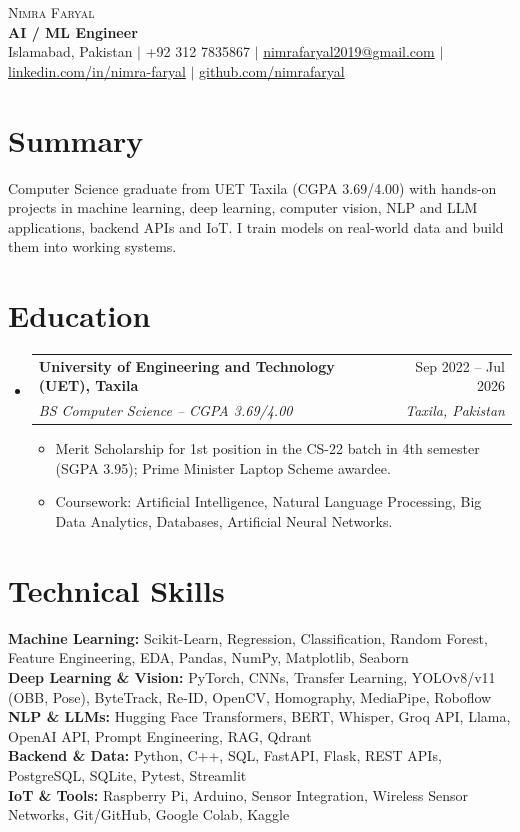 \documentclass[a4paper,10pt]{article}
\makeatletter
\newcommand{\resumeItem}[1]{\item\small{#1 \vspace{-2pt}}}
\newcommand{\resumeSubheading}[4]{
  \vspace{-2pt}\item
    \begin{tabular*}{\textwidth}[t]{l@{\extracolsep{\fill}}r}
      \textbf{#1} & \small #2 \\
      \small\textit{#3} & \small\textit{#4} \\
    \end{tabular*}\vspace{-6pt}
}
\newcommand{\resumeSubHeadingListStart}{\begin{itemize}[leftmargin=0.0in, label={}]}
\newcommand{\resumeSubHeadingListEnd}{\end{itemize}}
\newcommand{\resumeItemListStart}{\begin{itemize}[leftmargin=0.18in, itemsep=0pt]}
\newcommand{\resumeItemListEnd}{\end{itemize}\vspace{-4pt}}
\makeatother
\begin{document}
\begin{center}
    {\Huge \scshape Nimra Faryal} \\ \vspace{2pt}
    \textbf{AI / ML Engineer} \\ \vspace{3pt}
    \small Islamabad, Pakistan $|$ +92 312 7835867 $|$
    \href{mailto:nimrafaryal2019@gmail.com}{nimrafaryal2019@gmail.com} $|$
    \href{https://www.linkedin.com/in/nimra-faryal-47494225b/}{linkedin.com/in/nimra-faryal} $|$
    \href{https://github.com/nimrafaryal}{github.com/nimrafaryal}
\end{center}

\section{Summary}
\small{Computer Science graduate from UET Taxila (CGPA 3.69/4.00) with hands-on projects in machine learning, deep learning,
computer vision, NLP and LLM applications, backend APIs and IoT. I train models on real-world data and build them into working
systems.}

\section{Education}
\resumeSubHeadingListStart
  \resumeSubheading
    {University of Engineering and Technology (UET), Taxila}{Sep 2022 -- Jul 2026}
    {BS Computer Science -- CGPA 3.69/4.00}{Taxila, Pakistan}
    \resumeItemListStart
      \resumeItem{Merit Scholarship for 1st position in the CS-22 batch in 4th semester (SGPA 3.95); Prime Minister Laptop Scheme awardee.}
      \resumeItem{Coursework: Artificial Intelligence, Natural Language Processing, Big Data Analytics, Databases, Artificial Neural Networks.}
    \resumeItemListEnd
\resumeSubHeadingListEnd

\section{Technical Skills}
\begin{itemize}[leftmargin=0.0in, label={}]
  \small{\item{
    \textbf{Machine Learning:} Scikit-Learn, Regression, Classification, Random Forest, Feature Engineering, EDA, Pandas, NumPy, Matplotlib, Seaborn \\
    \textbf{Deep Learning \& Vision:} PyTorch, CNNs, Transfer Learning, YOLOv8/v11 (OBB, Pose), ByteTrack, Re-ID, OpenCV, Homography, MediaPipe, Roboflow \\
    \textbf{NLP \& LLMs:} Hugging Face Transformers, BERT, Whisper, Groq API, Llama, OpenAI API, Prompt Engineering, RAG, Qdrant \\
    \textbf{Backend \& Data:} Python, C++, SQL, FastAPI, Flask, REST APIs, PostgreSQL, SQLite, Pytest, Streamlit \\
    \textbf{IoT \& Tools:} Raspberry Pi, Arduino, Sensor Integration, Wireless Sensor Networks, Git/GitHub, Google Colab, Kaggle
  }}
\end{itemize}
\end{document}
